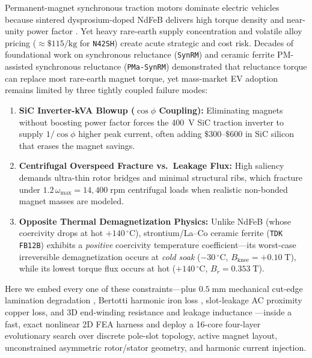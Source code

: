 \documentclass[twocolumn,10pt]{article}
\begin{document}
Permanent-magnet synchronous traction motors dominate electric vehicles because sintered dysprosium-doped NdFeB delivers high torque density and near-unity power factor \citep{pellegrino2012comparison,cai2016asymmetric}. Yet heavy rare-earth supply concentration and volatile alloy pricing ($\approx\$115/\text{kg}$ for \texttt{N42SH}) create acute strategic and cost risk. Decades of foundational work on synchronous reluctance (\texttt{SynRM}) \citep{vagati1994synchronous,boldea1996reluctance} and ceramic ferrite PM-assisted synchronous reluctance (\texttt{PMa-SynRM}) \citep{bianchi2009torque,sanada2014ferrite} demonstrated that reluctance torque can replace most rare-earth magnet torque, yet mass-market EV adoption remains limited by three tightly coupled failure modes:
\begin{enumerate}\setlength{\itemsep}{1pt}
  \item \textbf{SiC Inverter-kVA Blowup ($\cos\phi$ Coupling):} Eliminating magnets without boosting power factor forces the 400~V SiC traction inverter to supply $1/\cos\phi$ higher peak current, often adding $\$300\text{--}\$600$ in SiC silicon that erases the magnet savings.
  \item \textbf{Centrifugal Overspeed Fracture vs.\ Leakage Flux:} High saliency demands ultra-thin rotor bridges and minimal structural ribs, which fracture under $1.2\,\omega_{\max}=14{,}400\;\text{rpm}$ centrifugal loads when realistic non-bonded magnet masses are modeled.
  \item \textbf{Opposite Thermal Demagnetization Physics:} Unlike NdFeB (whose coercivity drops at hot $+140\,^\circ\text{C}$), strontium/La--Co ceramic ferrite (\texttt{TDK FB12B}) exhibits a \emph{positive} coercivity temperature coefficient---its worst-case irreversible demagnetization occurs at \emph{cold soak} ($-30\,^\circ\text{C}$, $B_{\text{knee}}=+0.10\;\text{T}$), while its lowest torque flux occurs at hot ($+140\,^\circ\text{C}$, $B_r=0.353\;\text{T}$).
\end{enumerate}

Here we embed every one of these constraints---plus $0.5\;\text{mm}$ mechanical cut-edge lamination degradation \citep{bali2017cutedge}, Bertotti harmonic iron loss \citep{bertotti1988general}, slot-leakage AC proximity copper loss, and 3D end-winding resistance and leakage inductance \citep{pyrhonen2014design}---inside a fast, exact nonlinear 2D FEA harness and deploy a 16-core four-layer evolutionary search over discrete pole-slot topology, active magnet layout, unconstrained asymmetric rotor/stator geometry, and harmonic current injection.
\end{document}
